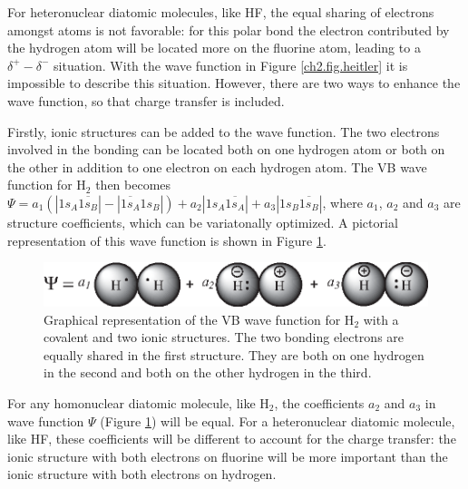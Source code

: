 For heteronuclear diatomic molecules, like HF, the equal sharing of electrons amongst atoms is not favorable: for this polar bond the electron contributed by the hydrogen atom will be located more on the fluorine atom, leading to a $\delta^{+}-\delta^{-}$ situation. With the wave function in Figure \ref{ch2.fig.heitler} it is impossible to describe this situation. However, there are two ways to enhance the wave function, so that charge transfer is included.

Firstly, ionic structures can be added to the wave function. The two electrons involved in the bonding can be located both on one hydrogen atom or both on the other in addition to one electron on each hydrogen atom. The VB wave function for H$_2$ then becomes $\Psi=a_1(|1s_{A}\overline{1s_{B}}| - |\overline{1s_{A}}1s_{B}|) + a_2 |1s_{A}\overline{1s_{A}}| + a_3 |1s_{B}\overline{1s_{B}}|$, where $a_1$, $a_2$ and $a_3$ are structure coefficients, which can be variatonally optimized. A pictorial representation of this wave function is shown in Figure \ref{ch2.fig.heitlerplus}.
\begin{figure}[ht]
\center
\includegraphics{orbopt/figures/heitlerplus.eps}
\caption{Graphical representation of the VB wave function for H$_2$ with a covalent and two ionic structures. The two bonding electrons are equally shared in the first structure. They are both on one hydrogen in the second and both on the other hydrogen in the third.}
\label{ch2.fig.heitlerplus}
\end{figure}
For any homonuclear diatomic molecule, like H$_2$, the coefficients $a_2$ and $a_3$ in wave function $\Psi$ (Figure \ref{ch2.fig.heitlerplus}) will be equal. For a heteronuclear diatomic molecule, like HF, these coefficients will be different to account for the charge transfer: the ionic structure with both electrons on fluorine will be more important than the ionic structure with both electrons on hydrogen. 

